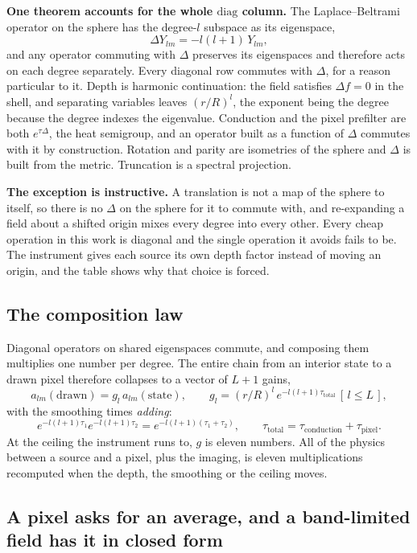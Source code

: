 \textbf{One theorem accounts for the whole \(\mathrm{diag}\) column.} The Laplace--Beltrami operator on the sphere has the degree-\(l\) subspace as its eigenspace,
\[
  \Delta Y_{lm} = -l(l+1)\, Y_{lm},
\]
and any operator commuting with \(\Delta\) preserves its eigenspaces and therefore acts on each degree separately. Every diagonal row commutes with \(\Delta\), for a reason particular to it. Depth is harmonic continuation: the field satisfies \(\Delta f = 0\) in the shell, and separating variables leaves \((r/R)^l\), the exponent being the degree because the degree indexes the eigenvalue. Conduction and the pixel prefilter are both \(e^{\tau\Delta}\), the heat semigroup, and an operator built as a function of \(\Delta\) commutes with it by construction. Rotation and parity are isometries of the sphere and \(\Delta\) is built from the metric. Truncation is a spectral projection.

\textbf{The exception is instructive.} A translation is not a map of the sphere to itself, so there is no \(\Delta\) on the sphere for it to commute with, and re-expanding a field about a shifted origin mixes every degree into every other. Every cheap operation in this work is diagonal and the single operation it avoids fails to be. The instrument gives each source its own depth factor instead of moving an origin, and the table shows why that choice is forced.

\subsection{The composition law}

Diagonal operators on shared eigenspaces commute, and composing them multiplies one number per degree. The entire chain from an interior state to a drawn pixel therefore collapses to a vector of \(L+1\) gains,
\[
  a_{lm}(\text{drawn}) = g_l \, a_{lm}(\text{state}),
  \qquad
  g_l = (r/R)^{l}\, e^{-l(l+1)\tau_{\mathrm{total}}}\, [\,l \le L\,],
\]
with the smoothing times \emph{adding}:
\[
  e^{-l(l+1)\tau_1} e^{-l(l+1)\tau_2} = e^{-l(l+1)(\tau_1 + \tau_2)},
  \qquad
  \tau_{\mathrm{total}} = \tau_{\mathrm{conduction}} + \tau_{\mathrm{pixel}}.
\]
At the ceiling the instrument runs to, \(g\) is eleven numbers. All of the physics between a source and a pixel, plus the imaging, is eleven multiplications recomputed when the depth, the smoothing or the ceiling moves.

\subsection{A pixel asks for an average, and a band-limited field has it in closed form}

